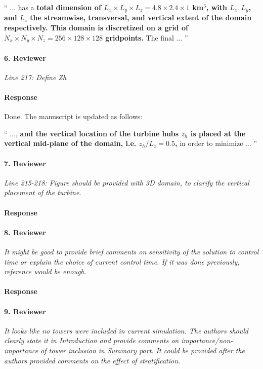 \documentclass[]{article}
\newcommand{\revision}[1]{\textbf{#1}}
\begin{document}
`` 
$\dots$ has a \revision{total dimension of $L_x \times L_y \times L_z = 4.8 \times 2.4 \times 1 $ km$^3$, with $L_x, L_y$, and $L_z$ the streamwise, transversal, and vertical extent of the domain respectively. This domain is discretized on a grid of $N_x \times N_y \times N_z = 256 \times 128 \times 128$ gridpoints.} The final $\dots$
''

\hrulefill

\paragraph{6. Reviewer} \textit{Line 217: Define Zh}

\paragraph{Response} Done. The manuscript is updated as follows:

``
$\dots$, \revision{and the vertical location of the turbine hubs $z_h$ is placed at the vertical mid-plane of the domain, i.e. $z_h/L_z = 0.5$,} in order to minimize $\dots$
''

\hrulefill

\paragraph{7. Reviewer} \textit{Line 215-218: Figure should be provided with 3D domain, to clarify the vertical placement of the turbine.}

\paragraph{Response} 

\hrulefill

\paragraph{8. Reviewer} \textit{It might be good to provide brief comments on sensitivity of the solution to control time or explain the choice of current control time. If it was done previously, reference would be enough.}

\paragraph{Response} 

\hrulefill

\paragraph{9. Reviewer} \textit{It looks like no towers were included in current simulation. The authors should clearly state it in Introduction and provide comments on importance/non-importance of tower inclusion in Summary part. It could be provided after the authors provided comments on the effect of stratification.}
\end{document}
